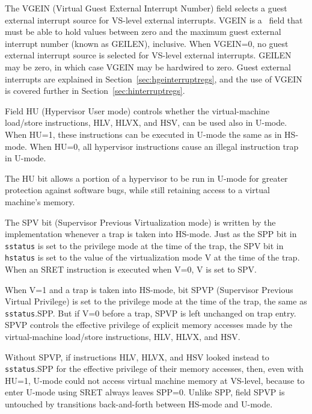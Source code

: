 The VGEIN (Virtual Guest External Interrupt Number) field selects a guest
external interrupt source for VS-level external interrupts.
VGEIN is a \wlrl\ field that must be able to hold values between zero
and the maximum guest external interrupt number (known as GEILEN),
inclusive.
When VGEIN=0, no guest external interrupt source is selected for VS-level
external interrupts.
GEILEN may be zero, in which case VGEIN may be hardwired to zero.
Guest external interrupts are explained in
Section~\ref{sec:hgeinterruptregs}, and the use of VGEIN is covered
further in Section~\ref{sec:hinterruptregs}.

Field HU (Hypervisor User mode) controls whether the virtual-machine
load/store instructions, HLV, HLVX, and HSV, can be used also in U-mode.
When HU=1, these instructions can be executed in U-mode the same as in
HS-mode.
When HU=0, all hypervisor instructions cause an illegal instruction trap
in U-mode.

\begin{commentary}
The HU bit allows a portion of a hypervisor to be run in U-mode for
greater protection against software bugs, while still retaining access to
a virtual machine's memory.
\end{commentary}

The SPV bit (Supervisor Previous Virtualization mode) is written by the implementation
whenever a trap is taken into HS-mode.  Just as the SPP bit in {\tt sstatus} is set to the privilege
mode at the time of the trap, the SPV bit in {\tt hstatus} is set to the value of the virtualization
mode V at the time of the trap.  When an SRET instruction is executed when V=0,
V is set to SPV.

When V=1 and a trap is taken into HS-mode, bit SPVP (Supervisor Previous
Virtual Privilege) is set to the privilege mode at the time of the trap,
the same as {\tt sstatus}.SPP.
But if V=0 before a trap, SPVP is left unchanged on trap entry.
SPVP controls the effective privilege of explicit memory accesses made by
the virtual-machine load/store instructions, HLV, HLVX, and HSV.

\begin{commentary}
Without SPVP, if instructions HLV, HLVX, and HSV looked instead to
{\tt sstatus}.SPP for the effective privilege of their memory accesses,
then, even with HU=1, U-mode could not access virtual machine memory at
VS-level, because to enter U-mode using SRET always leaves SPP=0.
Unlike SPP, field SPVP is untouched by transitions back-and-forth between
HS-mode and U-mode.
\end{commentary}

